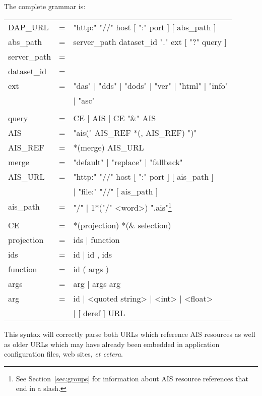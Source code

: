 \documentclass{article}
\begin{document}
The complete grammar is:
\medskip

\begin{minipage}{5in}
\begin{ttfamily}
\begin{center}
\begin{tabular}{lll}
DAP\_URL & = & "http:" "//" host [ ":" port ] [ abs\_path ] \\
abs\_path & = & server\_path dataset\_id "." ext [ "?" query ] \\
server\_path & = & \\
dataset\_id &= & \\
ext & = & "das" | "dds" | "dods" | "ver" | "html" | "info" \\
    &   & | "asc" \\
\\
query & = & CE | AIS | CE "\&" AIS\\
AIS & = & "ais(" AIS\_REF *(, AIS\_REF) ")"\\
AIS\_REF & = & *(merge) AIS\_URL \\
merge & = & "default" | "replace" | "fallback" \\
AIS\_URL & = & "http:" "//" host [ ":" port ] [ ais\_path ] \\
         &   & | "file:" "//" [ ais\_path ]\\
ais\_path & = & "/" | 1*("/" <word>) ".ais"\footnote{See
  Section~\ref{sec:groups} for information about AIS resource references that
  end in a slash.}\\
\\
CE & = & *(projection) *(\& selection) \\
projection & = & ids | function \\
ids & = & id | id , ids \\
function & = & id ( args ) \\
args & = & arg | args arg \\
arg & = & id | <quoted string> | <int> | <float> \\
    &   & | [ deref ] URL \\
\end{tabular}
\end{center}
\end{ttfamily}
\end{minipage}
\cbend

This syntax will correctly parse both \ac{URL}s which reference \ac{AIS}
resources as well as older \ac{URL}s which may have already been embedded in
application configuration files, web sites, \emph{et cetera}.
\end{document}
